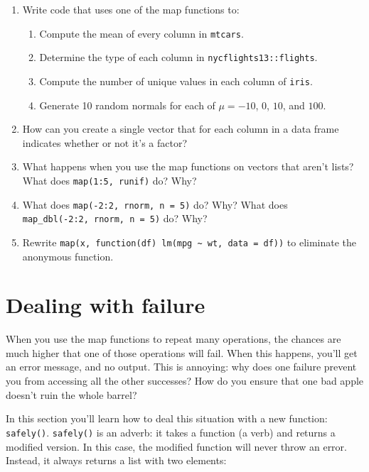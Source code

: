 \documentclass[]{book}
\providecommand{\tightlist}{%
  \setlength{\itemsep}{0pt}\setlength{\parskip}{0pt}}
\begin{document}
\begin{enumerate}
\def\labelenumi{\arabic{enumi}.}
\item
  Write code that uses one of the map functions to:

  \begin{enumerate}
  \def\labelenumii{\arabic{enumii}.}
  \tightlist
  \item
    Compute the mean of every column in \texttt{mtcars}.
  \item
    Determine the type of each column in \texttt{nycflights13::flights}.
  \item
    Compute the number of unique values in each column of \texttt{iris}.
  \item
    Generate 10 random normals for each of \(\mu = -10\), \(0\), \(10\),
    and \(100\).
  \end{enumerate}
\item
  How can you create a single vector that for each column in a data
  frame indicates whether or not it's a factor?
\item
  What happens when you use the map functions on vectors that aren't
  lists? What does \texttt{map(1:5,\ runif)} do? Why?
\item
  What does \texttt{map(-2:2,\ rnorm,\ n\ =\ 5)} do? Why? What does
  \texttt{map\_dbl(-2:2,\ rnorm,\ n\ =\ 5)} do? Why?
\item
  Rewrite
  \texttt{map(x,\ function(df)\ lm(mpg\ \textasciitilde{}\ wt,\ data\ =\ df))}
  to eliminate the anonymous function.
\end{enumerate}

\section{Dealing with failure}\label{dealing-with-failure}

When you use the map functions to repeat many operations, the chances
are much higher that one of those operations will fail. When this
happens, you'll get an error message, and no output. This is annoying:
why does one failure prevent you from accessing all the other successes?
How do you ensure that one bad apple doesn't ruin the whole barrel?

In this section you'll learn how to deal this situation with a new
function: \texttt{safely()}. \texttt{safely()} is an adverb: it takes a
function (a verb) and returns a modified version. In this case, the
modified function will never throw an error. Instead, it always returns
a list with two elements:
\end{document}
